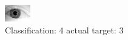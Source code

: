 \begin{figure}[h!]
\begin{center}
\includegraphics[width=0.60\columnwidth]{figures/ID2078_class_4_target_3.png}
\end{center}
\caption{ Classification: 4 actual target: 3}
\label{fig:ID2078_class_4_target_3}
\end{figure}

